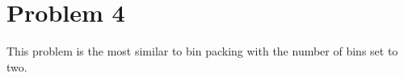 \section*{Problem 4}

This problem is the most similar to bin packing with the number of bins set to two.